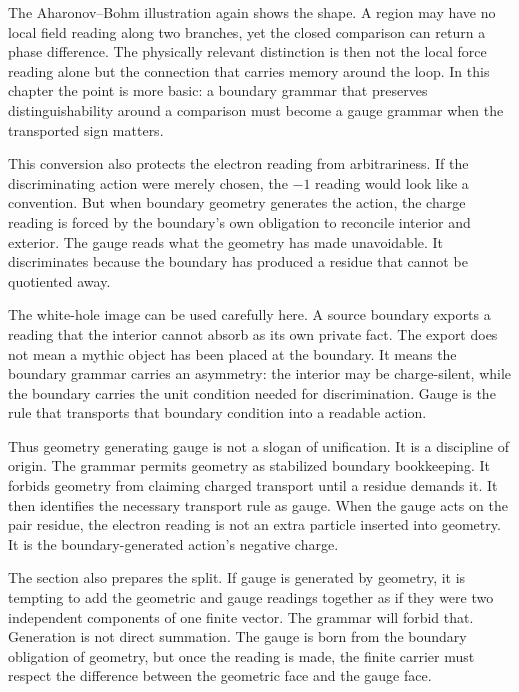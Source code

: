 The Aharonov--Bohm illustration again shows the shape. A region may have no
local field reading along two branches, yet the closed comparison can return
a phase difference. The physically relevant distinction is then not the
local force reading alone but the connection that carries memory around the
loop. In this chapter the point is more basic: a boundary grammar that
preserves distinguishability around a comparison must become a gauge grammar
when the transported sign matters.

This conversion also protects the electron reading from arbitrariness. If
the discriminating action were merely chosen, the \(-1\) reading would look
like a convention. But when boundary geometry generates the action, the
charge reading is forced by the boundary's own obligation to reconcile
interior and exterior. The gauge reads what the geometry has made
unavoidable. It discriminates because the boundary has produced a residue
that cannot be quotiented away.

The white-hole image can be used carefully here. A source boundary exports a
reading that the interior cannot absorb as its own private fact. The export
does not mean a mythic object has been placed at the boundary. It means the
boundary grammar carries an asymmetry: the interior may be charge-silent,
while the boundary carries the unit condition needed for discrimination.
Gauge is the rule that transports that boundary condition into a readable
action.

Thus geometry generating gauge is not a slogan of unification. It is a
discipline of origin. The grammar permits geometry as stabilized boundary
bookkeeping. It forbids geometry from claiming charged transport until a
residue demands it. It then identifies the necessary transport rule as gauge.
When the gauge acts on the pair residue, the electron reading is not an
extra particle inserted into geometry. It is the boundary-generated action's
negative charge.

The section also prepares the split. If gauge is generated by geometry, it
is tempting to add the geometric and gauge readings together as if they were
two independent components of one finite vector. The grammar will forbid
that. Generation is not direct summation. The gauge is born from the boundary
obligation of geometry, but once the reading is made, the finite carrier must
respect the difference between the geometric face and the gauge face.


